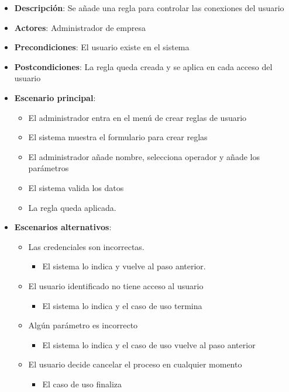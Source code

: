 \documentclass[12pt,a4paperpaper,]{report}
\providecommand{\tightlist}{%
  \setlength{\itemsep}{0pt}\setlength{\parskip}{0pt}}
\begin{document}
\begin{itemize}
\tightlist
\item
  \textbf{Descripción}: Se añade una regla para controlar las conexiones
  del usuario
\item
  \textbf{Actores}: Administrador de empresa
\item
  \textbf{Precondiciones}: El usuario existe en el sistema
\item
  \textbf{Postcondiciones}: La regla queda creada y se aplica en cada
  acceso del usuario
\item
  \textbf{Escenario principal}:

  \begin{itemize}
  \tightlist
  \item
    El administrador entra en el menú de crear reglas de usuario
  \item
    El sistema muestra el formulario para crear reglas
  \item
    El administrador añade nombre, selecciona operador y añade los
    parámetros
  \item
    El sistema valida los datos
  \item
    La regla queda aplicada.
  \end{itemize}
\item
  \textbf{Escenarios alternativos}:

  \begin{itemize}
  \tightlist
  \item
    Las credenciales son incorrectas.

    \begin{itemize}
    \tightlist
    \item
      El sistema lo indica y vuelve al paso anterior.
    \end{itemize}
  \item
    El usuario identificado no tiene acceso al usuario

    \begin{itemize}
    \tightlist
    \item
      El sistema lo indica y el caso de uso termina
    \end{itemize}
  \item
    Algún parámetro es incorrecto

    \begin{itemize}
    \tightlist
    \item
      El sistema lo indica y el caso de uso vuelve al paso anterior
    \end{itemize}
  \item
    El usuario decide cancelar el proceso en cualquier momento

    \begin{itemize}
    \tightlist
    \item
      El caso de uso finaliza
    \end{itemize}
  \end{itemize}
\end{itemize}
\end{document}
